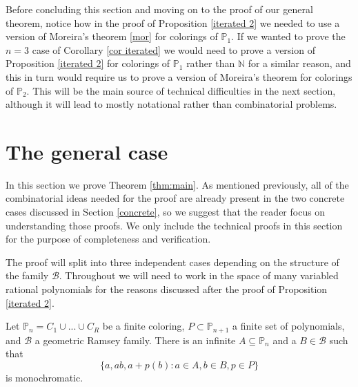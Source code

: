 \documentclass[tocmacros]{daj}
\begin{document}
Before concluding this section and moving on to the proof of our general theorem, notice how in the proof of Proposition \ref{iterated 2} we needed to use a version of Moreira's theorem \ref{mor} for colorings of $\mathbb{P}_1.$  If we wanted to prove the $n=3$ case of Corollary \ref{cor iterated} we would need to prove a version of Proposition \ref{iterated 2} for colorings of $\mathbb{P}_1$ rather than $\mathbb{N}$ for a similar reason, and this in turn would require us to prove a version of Moreira's theorem for colorings of $\mathbb{P}_2.$  This will be the main source of technical difficulties in the next section, although it will lead to mostly notational rather than combinatorial problems.




\section{The general case}

In this section we prove Theorem \ref{thm:main}.  As mentioned previously, all of the combinatorial ideas needed for the proof are already present in the two concrete cases discussed in Section \ref{concrete}, so we suggest that the reader focus on understanding those proofs.  We only include the technical proofs in this section for the purpose of completeness and verification.

The proof will split into three independent cases depending on the structure of the family $\mathcal{B}$.  Throughout we will need to work in the space of many variabled rational polynomials for the reasons discussed after the proof of Proposition \ref{iterated 2}.  

\begin{proposition}\label{geo proof}
Let $\mathbb{P}_n=C_1\cup...\cup C_R$ be a finite coloring, $P\subset \mathbb{P}_{n+1}$ a finite set of polynomials, and $\mathcal{B}$ a geometric Ramsey family.  There is an infinite $A\subseteq \mathbb{P}_n$ and a $B\in\mathcal{B}$ such that $$\{a,ab,a+p(b): a\in A, b\in B, p\in P\}$$ is monochromatic.  
\end{proposition}
\end{document}
